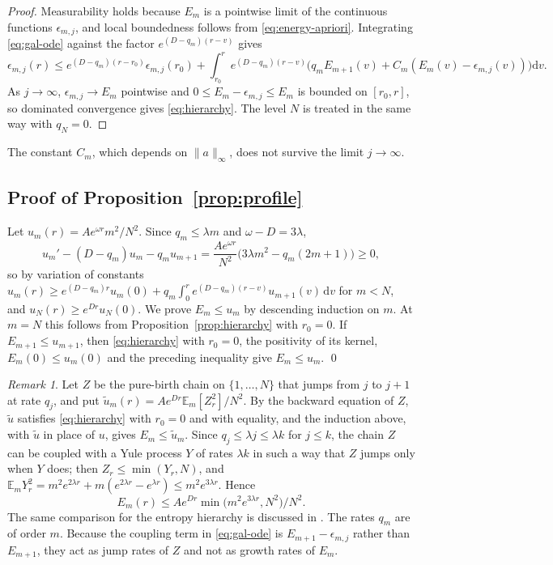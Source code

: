 \documentclass[11pt]{amsart}
\numberwithin{equation}{section}
\theoremstyle{plain}
\theoremstyle{remark}
\newtheorem{remark}[theorem]{Remark}
\newcommand{\E}{\mathbb{E}}
\newcommand{\dd}{\mathrm{d}}
\begin{document}
\begin{proof}
Measurability holds because $E_m$ is a pointwise limit of the continuous functions $\epsilon_{m,j}$, and local boundedness follows from \eqref{eq:energy-apriori}. Integrating \eqref{eq:gal-ode} against the factor $e^{(D-q_m)(r-v)}$ gives
\[
\epsilon_{m,j}(r)\le e^{(D-q_m)(r-r_0)}\epsilon_{m,j}(r_0)+\int_{r_0}^re^{(D-q_m)(r-v)}\big(q_mE_{m+1}(v)+C_m(E_m(v)-\epsilon_{m,j}(v))\big)\dd v.
\]
As $j\to\infty$, $\epsilon_{m,j}\to E_m$ pointwise and $0\le E_m-\epsilon_{m,j}\le E_m$ is bounded on $[r_0,r]$, so dominated convergence gives \eqref{eq:hierarchy}. The level $N$ is treated in the same way with $q_N=0$.
\end{proof}

The constant $C_m$, which depends on $\|a\|_\infty$, does not survive the limit $j\to\infty$.

\subsection{Proof of Proposition~\ref{prop:profile}}
Let $u_m(r)=Ae^{\omega r}m^2/N^2$. Since $q_m\le\lambda m$ and $\omega-D=3\lambda$,
\[
u_m'-(D-q_m)u_m-q_mu_{m+1}=\frac{Ae^{\omega r}}{N^2}\big(3\lambda m^2-q_m(2m+1)\big)\ge0,
\]
so by variation of constants $u_m(r)\ge e^{(D-q_m)r}u_m(0)+q_m\int_0^re^{(D-q_m)(r-v)}u_{m+1}(v)\,\dd v$ for $m<N$, and $u_N(r)\ge e^{Dr}u_N(0)$. We prove $E_m\le u_m$ by descending induction on $m$. At $m=N$ this follows from Proposition~\ref{prop:hierarchy} with $r_0=0$. If $E_{m+1}\le u_{m+1}$, then \eqref{eq:hierarchy} with $r_0=0$, the positivity of its kernel, $E_m(0)\le u_m(0)$ and the preceding inequality give $E_m\le u_m$. \qed

\begin{remark}\label{rem:yule}
Let $Z$ be the pure-birth chain on $\{1,\dots,N\}$ that jumps from $j$ to $j+1$ at rate $q_j$, and put $\tilde u_m(r)=Ae^{Dr}\E_m[Z_r^2]/N^2$. By the backward equation of $Z$, $\tilde u$ satisfies \eqref{eq:hierarchy} with $r_0=0$ and with equality, and the induction above, with $\tilde u$ in place of $u$, gives $E_m\le\tilde u_m$. Since $q_j\le\lambda j\le\lambda k$ for $j\le k$, the chain $Z$ can be coupled with a Yule process $Y$ of rates $\lambda k$ in such a way that $Z$ jumps only when $Y$ does; then $Z_r\le\min(Y_r,N)$, and $\E_mY_r^2=m^2e^{2\lambda r}+m(e^{2\lambda r}-e^{\lambda r})\le m^2e^{3\lambda r}$. Hence
\[
E_m(r)\le Ae^{Dr}\min\big(m^2e^{3\lambda r},N^2\big)/N^2.
\]
The same comparison for the entropy hierarchy is discussed in \cite[Section~1.5]{LYZ24}. The rates $q_m$ are of order $m$. Because the coupling term in \eqref{eq:gal-ode} is $E_{m+1}-\epsilon_{m,j}$ rather than $E_{m+1}$, they act as jump rates of $Z$ and not as growth rates of $E_m$.
\end{remark}
\end{document}
